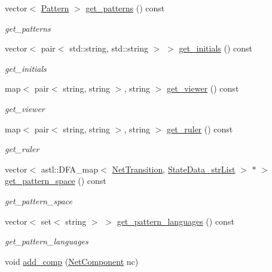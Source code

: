 \begin{DoxyCompactItemize}
vector$<$ \hyperlink{class_pattern}{Pattern} $>$ \hyperlink{class_network_model_af72c9c9d6889647c091786fefdb184a9}{get\+\_\+patterns} () const 
\begin{DoxyCompactList}\small\item\em get\+\_\+patterns \end{DoxyCompactList}\item 
vector$<$ pair$<$ std\+::string, std\+::string $>$ $>$ \hyperlink{class_network_model_a6e227573863655c96aa1b6cf7136863a}{get\+\_\+initials} () const 
\begin{DoxyCompactList}\small\item\em get\+\_\+initials \end{DoxyCompactList}\item 
map$<$ pair$<$ string, string $>$, string $>$ \hyperlink{class_network_model_ac1546106a62f35dca850f23a2c137c9b}{get\+\_\+viewer} () const 
\begin{DoxyCompactList}\small\item\em get\+\_\+viewer \end{DoxyCompactList}\item 
map$<$ pair$<$ string, string $>$, string $>$ \hyperlink{class_network_model_a8aebf68fbb04f19840641c4e12540d13}{get\+\_\+ruler} () const 
\begin{DoxyCompactList}\small\item\em get\+\_\+ruler \end{DoxyCompactList}\item 
vector$<$ astl\+::\+D\+F\+A\+\_\+map$<$ \hyperlink{class_net_transition}{Net\+Transition}, \hyperlink{class_state_data__str_list}{State\+Data\+\_\+str\+List} $>$ $\ast$ $>$ \hyperlink{class_network_model_ae34c23f6543d3cb4a5c1ef5ae18ac1a0}{get\+\_\+pattern\+\_\+space} () const 
\begin{DoxyCompactList}\small\item\em get\+\_\+pattern\+\_\+space \end{DoxyCompactList}\item 
vector$<$ set$<$ string $>$ $>$ \hyperlink{class_network_model_aee2158178eb05711c5f438f365bbe959}{get\+\_\+pattern\+\_\+languages} () const 
\begin{DoxyCompactList}\small\item\em get\+\_\+pattern\+\_\+languages \end{DoxyCompactList}\item 
void \hyperlink{class_network_model_adb9a3df843ce10b846f1a6d42d36ab89}{add\+\_\+comp} (\hyperlink{class_net_component}{Net\+Component} nc)

\end{DoxyCompactItemize}
